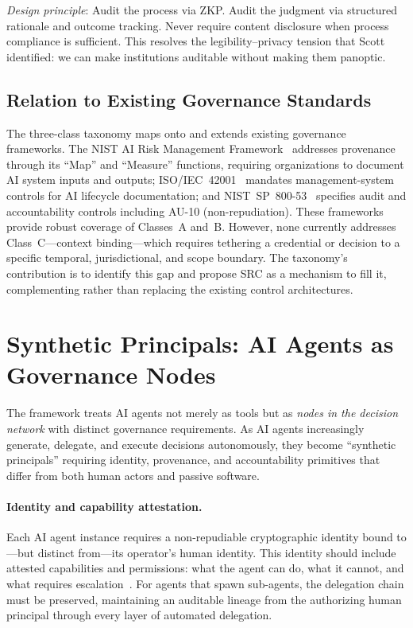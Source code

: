 \documentclass[runningheads]{llncs}
\begin{document}
\emph{Design principle}: Audit the process via ZKP. Audit the judgment via structured rationale and outcome tracking. Never require content disclosure when process compliance is sufficient. This resolves the legibility--privacy tension that Scott identified: we can make institutions auditable without making them panoptic.

\subsection{Relation to Existing Governance Standards}

The three-class taxonomy maps onto and extends existing governance frameworks. The NIST AI Risk Management Framework~\cite{nist2023airm,nist2024genai} addresses provenance through its ``Map'' and ``Measure'' functions, requiring organizations to document AI system inputs and outputs; ISO/IEC~42001~\cite{iso42001} mandates management-system controls for AI lifecycle documentation; and NIST~SP~800-53~\cite{nist2020sp800} specifies audit and accountability controls including AU-10 (non-repudiation). These frameworks provide robust coverage of Classes~A and~B. However, none currently addresses Class~C---context binding---which requires tethering a credential or decision to a specific temporal, jurisdictional, and scope boundary. The taxonomy's contribution is to identify this gap and propose SRC as a mechanism to fill it, complementing rather than replacing the existing control architectures.


\section{Synthetic Principals: AI Agents as Governance Nodes}
\label{sec:synthetic}

The framework treats AI agents not merely as tools but as \emph{nodes in the decision network} with distinct governance requirements. As AI agents increasingly generate, delegate, and execute decisions autonomously, they become ``synthetic principals'' requiring identity, provenance, and accountability primitives that differ from both human actors and passive software.

\paragraph{Identity and capability attestation.}
Each AI agent instance requires a non-repudiable cryptographic identity bound to---but distinct from---its operator's human identity. This identity should include attested capabilities and permissions: what the agent can do, what it cannot, and what requires escalation~\cite{narvaneni2025agent}. For agents that spawn sub-agents, the delegation chain must be preserved, maintaining an auditable lineage from the authorizing human principal through every layer of automated delegation.
\end{document}

